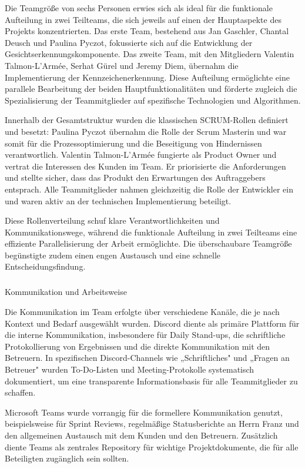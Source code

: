Die Teamgröße von sechs Personen erwies sich als ideal für die funktionale Aufteilung in zwei Teilteams, die sich jeweils auf einen der Hauptaspekte des Projekts konzentrierten. Das erste Team, bestehend aus Jan Gaschler, Chantal Deusch und Paulina Pyczot, fokussierte sich auf die Entwicklung der Gesichtserkennungskomponente. Das zweite Team, mit den Mitgliedern Valentin Talmon-L'Armée, Serhat Gürel und Jeremy Diem, übernahm die Implementierung der Kennzeichenerkennung. Diese Aufteilung ermöglichte eine parallele Bearbeitung der beiden Hauptfunktionalitäten und förderte zugleich die Spezialisierung der Teammitglieder auf spezifische Technologien und Algorithmen.

Innerhalb der Gesamtstruktur wurden die klassischen SCRUM-Rollen definiert und besetzt: Paulina Pyczot übernahm die Rolle der Scrum Masterin und war somit für die Prozessoptimierung und die Beseitigung von Hindernissen verantwortlich. Valentin Talmon-L'Armée fungierte als Product Owner und vertrat die Interessen des Kunden im Team. Er priorisierte die Anforderungen und stellte sicher, dass das Produkt den Erwartungen des Auftraggebers entsprach. Alle Teammitglieder nahmen gleichzeitig die Rolle der Entwickler ein und waren aktiv an der technischen Implementierung beteiligt.

Diese Rollenverteilung schuf klare Verantwortlichkeiten und Kommunikationswege, während die funktionale Aufteilung in zwei Teilteams eine effiziente Parallelisierung der Arbeit ermöglichte. Die überschaubare Teamgröße begünstigte zudem einen engen Austausch und eine schnelle Entscheidungsfindung.

\subparagraph{}{Kommunikation und Arbeitsweise}

Die Kommunikation im Team erfolgte über verschiedene Kanäle, die je nach Kontext und Bedarf ausgewählt wurden. Discord diente als primäre Plattform für die interne Kommunikation, insbesondere für Daily Stand-ups, die schriftliche Protokollierung von Ergebnissen und die direkte Kommunikation mit den Betreuern. In spezifischen Discord-Channels wie „Schriftliches" und „Fragen an Betreuer" wurden To-Do-Listen und Meeting-Protokolle systematisch dokumentiert, um eine transparente Informationsbasis für alle Teammitglieder zu schaffen.

Microsoft Teams wurde vorrangig für die formellere Kommunikation genutzt, beispielsweise für Sprint Reviews, regelmäßige Statusberichte an Herrn Franz und den allgemeinen Austausch mit dem Kunden und den Betreuern. Zusätzlich diente Teams als zentrales Repository für wichtige Projektdokumente, die für alle Beteiligten zugänglich sein sollten.

